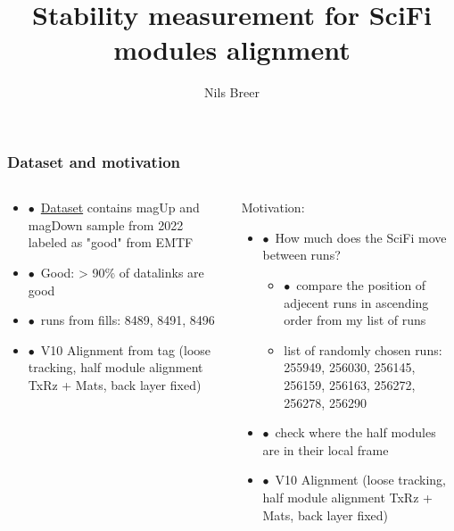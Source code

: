 \documentclass[aspectratio=1610, 12pt]{beamer}
\title{Stability measurement for SciFi modules alignment}
\author[N.Breer]{Nils Breer}
\institute{TU Dortmund, AG Albrecht}
\begin{document}
\maketitle

\begin{frame}\frametitle{Dataset and motivation}
  \begin{columns}
    \begin{column}[c]{0.48\textwidth}
      \begin{itemize}
        \setlength\itemsep{0em}
        \item $\bullet$\, \href{https://twiki.cern.ch/twiki/bin/viewauth/LHCbInternal/CommissioningData2022}{Dataset} contains magUp and magDown sample from 2022 labeled as "good" from EMTF
        \item $\bullet$\, Good: > 90\% of datalinks are good
        \item $\bullet$\, runs from fills: 8489, 8491, 8496
        \item $\bullet$\, V10 Alignment from tag (loose tracking, half module alignment TxRz + Mats, back layer fixed)
      \end{itemize}
    \end{column}
    \begin{column}[c]{0.48\textwidth}
      Motivation:
      \begin{itemize}
        \setlength\itemsep{-1em}
        \item $\bullet$\, How much does the SciFi move between runs?
        \begin{itemize}
          \item $\bullet$\, compare the position of adjecent runs in ascending order from my list of runs
          \item list of randomly chosen runs: 255949, 256030, 256145, 256159, 256163, 256272, 256278, 256290
        \end{itemize}
        \item $\bullet$\, check where the half modules are in their
        local frame
        \item $\bullet$\, V10 Alignment (loose tracking, half module alignment TxRz + Mats, back layer fixed)
      \end{itemize}
    \end{column}
  \end{columns}
\end{frame}
\end{document}
